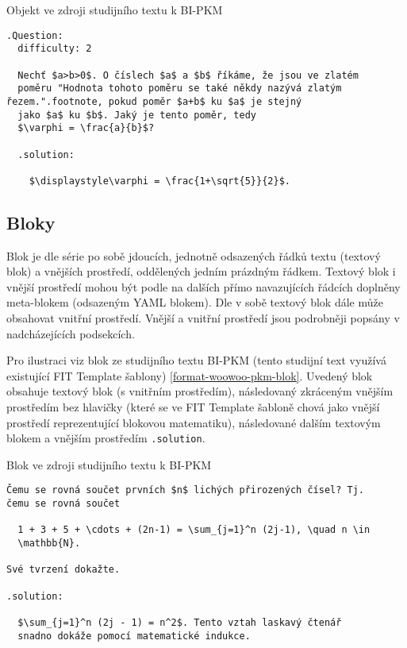 \begin{listing}
    \caption{Objekt ve zdroji studijního textu k BI-PKM \cite{pkm}}
    \label{format-woowoo-pkm-otazka}
    \begin{verbatim}
.Question:
  difficulty: 2

  Nechť $a>b>0$. O číslech $a$ a $b$ říkáme, že jsou ve zlatém
  poměru "Hodnota tohoto poměru se také někdy nazývá zlatým řezem.".footnote, pokud poměr $a+b$ ku $a$ je stejný
  jako $a$ ku $b$. Jaký je tento poměr, tedy
  $\varphi = \frac{a}{b}$?

  .solution:

    $\displaystyle\varphi = \frac{1+\sqrt{5}}{2}$.
    \end{verbatim}
\end{listing}

\subsection{Bloky}

Blok je dle \cite{woowoo} série po sobě jdoucích, jednotně odsazených řádků textu (textový blok) a vnějších prostředí,
oddělených jedním prázdným řádkem. Textový blok i vnější prostředí mohou být podle \cite{woowoo} na dalších přímo
navazujících řádcích doplněny meta-blokem (odsazeným YAML blokem). Dle \cite{woowoo} v sobě textový blok dále může
obsahovat vnitřní prostředí. Vnější a vnitřní prostředí jsou podrobněji popsány v nadcházejících podsekcích.

Pro ilustraci viz blok ze studijního textu BI-PKM (tento studijní text využívá existující FIT Template šablony)
\ref{format-woowoo-pkm-blok}. Uvedený blok obsahuje textový blok (s vnitřním prostředím), následovaný zkráceným vnějším
prostředím bez hlavičky (které se ve FIT Template šabloně chová jako vnější prostředí reprezentující blokovou
matematiku), následované dalším textovým blokem a vnějším prostředím \texttt{.solution}.

\begin{listing}
    \caption{Blok ve zdroji studijního textu k BI-PKM \cite{pkm}}
    \label{format-woowoo-pkm-blok}
    \begin{verbatim}
Čemu se rovná součet prvních $n$ lichých přirozených čísel? Tj.
čemu se rovná součet

  1 + 3 + 5 + \cdots + (2n-1) = \sum_{j=1}^n (2j-1), \quad n \in
  \mathbb{N}.

Své tvrzení dokažte.

.solution:

  $\sum_{j=1}^n (2j - 1) = n^2$. Tento vztah laskavý čtenář
  snadno dokáže pomocí matematické indukce.
    \end{verbatim}
\end{listing}

